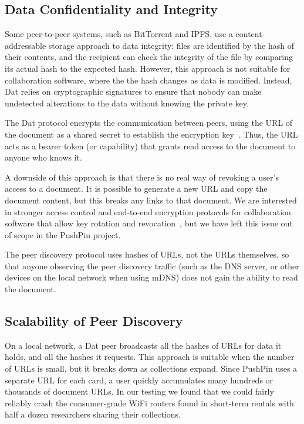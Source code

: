 \documentclass[sigplan,10pt]{acmart}
\begin{document}
\subsection{Data Confidentiality and Integrity}

Some peer-to-peer systems, such as BitTorrent and IPFS, use a content-addressable storage approach to data integrity: files are identified by the hash of their contents, and the recipient can check the integrity of the file by comparing its actual hash to the expected hash. However, this approach is not suitable for collaboration software, where the the hash changes as data is modified. Instead, Dat relies on cryptographic signatures to ensure that nobody can make undetected alterations to the data without knowing the private key.

The Dat protocol encrypts the communication between peers, using the URL of the document as a shared secret to establish the encryption key~\cite{HowDatWorks}.
Thus, the URL acts as a bearer token (or capability) that grants read access to the document to anyone who knows it.

A downside of this approach is that there is no real way of revoking a user's access to a document.
It is possible to generate a new URL and copy the document content, but this breaks any links to that document.
We are interested in stronger access control and end-to-end encryption protocols for collaboration software that allow key rotation and revocation~\cite{Kleppmann:2018tk}, but we have left this issue out of scope in the PushPin project.

The peer discovery protocol uses hashes of URLs, not the URLs themselves, so that anyone observing the peer discovery traffic (such as the DNS server, or other devices on the local network when using mDNS) does not gain the ability to read the document.

\subsection{Scalability of Peer Discovery}

On a local network, a Dat peer broadcasts all the hashes of URLs for data it holds, and all the hashes it requests.
This approach is suitable when the number of URLs is small, but it breaks down as collections expand.
Since PushPin uses a separate URL for each card, a user quickly accumulates many hundreds or thousands of document URLs.
In our testing we found that we could fairly reliably crash the consumer-grade WiFi routers found in short-term rentals with half a dozen researchers sharing their collections.
\end{document}
